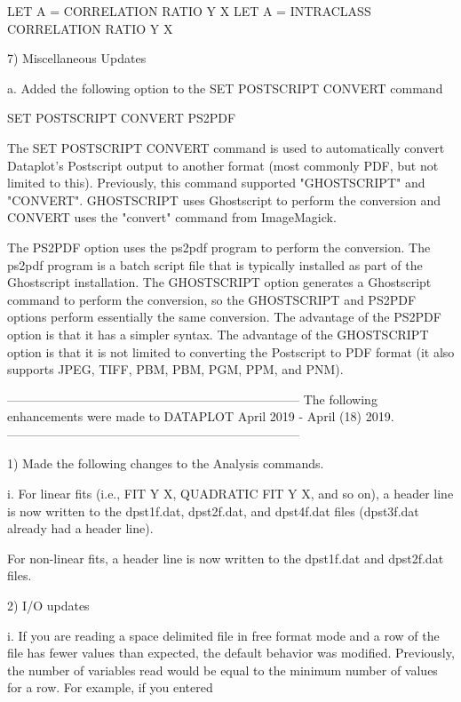       LET A = CORRELATION RATIO Y X
      LET A = INTRACLASS CORRELATION RATIO Y X

 7) Miscellaneous Updates

    a. Added the following option to the SET POSTSCRIPT CONVERT
       command

          SET POSTSCRIPT CONVERT PS2PDF

       The SET POSTSCRIPT CONVERT command is used to automatically
       convert Dataplot's Postscript output to another format (most
       commonly PDF, but not limited to this).  Previously, this
       command supported "GHOSTSCRIPT" and "CONVERT".  GHOSTSCRIPT
       uses Ghostscript to perform the conversion and CONVERT uses
       the "convert" command from ImageMagick.

       The PS2PDF option uses the ps2pdf program to perform the
       conversion.  The ps2pdf program is a batch script file that
       is typically installed as part of the Ghostscript installation.
       The GHOSTSCRIPT option generates a Ghostscript command to
       perform the conversion, so the GHOSTSCRIPT and PS2PDF options
       perform essentially the same conversion.  The advantage of the
       PS2PDF option is that it has a simpler syntax.  The advantage
       of the GHOSTSCRIPT option is that it is not limited to
       converting the Postscript to PDF format (it also supports
       JPEG, TIFF, PBM, PBM, PGM, PPM, and PNM).

-----------------------------------------------------------------------
The following enhancements were made to DATAPLOT
April 2019 - April (18) 2019.
-----------------------------------------------------------------------

 1) Made the following changes to the Analysis commands.

      i. For linear fits (i.e., FIT Y X, QUADRATIC FIT Y X, and so on), a
         header line is now written to the dpst1f.dat, dpst2f.dat, and
         dpst4f.dat files (dpst3f.dat already had a header line).

         For non-linear fits, a header line is now written to the dpst1f.dat
         and dpst2f.dat files.

 2) I/O updates

      i. If you are reading a space delimited file in free format mode
         and a row of the file has fewer values than expected, the
         default behavior was modified.  Previously, the number of
         variables read would be equal to the minimum number of values
         for a row.  For example, if you entered

